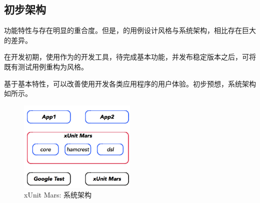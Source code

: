 \begin{content}

\subsection{初步架构}

功能特性与存在明显的重合度。但是，的用例设计风格与系统架构，相比存在巨大的差异。

在开发初期，使用作为的开发工具，待完成基本功能，并发布稳定版本之后，可将既有测试用例重构为风格。

基于基本特性，可以改善使用开发各类应用程序的用户体验。初步预想，系统架构如所示。

\begin{figure}[H]
\centering
\includegraphics[width=0.5\textwidth]{figures/xunit/framework.png}
\caption{xUnit Mars: 系统架构}
 \label{fig:mars-framework}
\end{figure}

\end{content}
